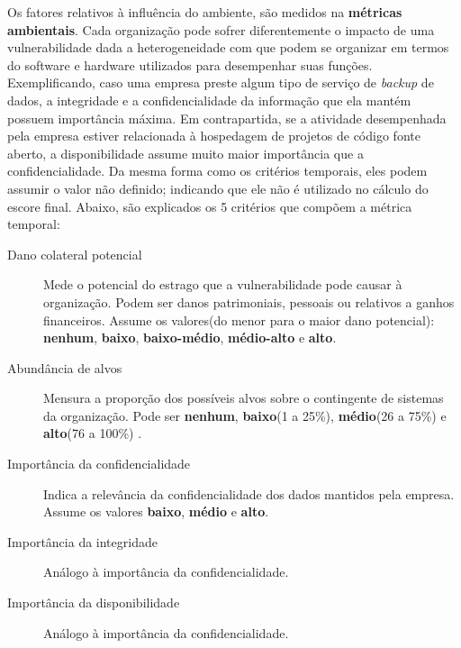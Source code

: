 			Os fatores relativos à influência do ambiente, são medidos na \textbf{métricas
			ambientais}. Cada organização pode sofrer diferentemente o impacto de uma
			vulnerabilidade dada a heterogeneidade com que podem se organizar em termos
			do software e hardware utilizados para desempenhar suas funções.
			Exemplificando, caso uma empresa preste algum tipo de serviço de \textsl{backup} de
			dados, a integridade e a confidencialidade da informação que ela mantém
			possuem importância máxima. Em contrapartida, se a atividade desempenhada pela
			empresa estiver relacionada à hospedagem de projetos de código fonte aberto,
			a disponibilidade assume muito maior importância que a confidencialidade.
			Da mesma forma como os critérios temporais, eles podem assumir o valor não definido;
			indicando que ele não é utilizado no cálculo do escore final.
			Abaixo, são explicados os 5 critérios que compõem a métrica temporal:
			\begin{description}
				\item[Dano colateral potencial]{
					Mede o potencial do estrago que a vulnerabilidade pode causar à organização.
					Podem ser danos patrimoniais, pessoais ou relativos a ganhos financeiros.
					Assume os valores(do menor para o maior dano potencial):
					\textbf{nenhum}, \textbf{baixo}, \textbf{baixo-médio}, \textbf{médio-alto} e
					\textbf{alto}}.
				\item[Abundância de alvos]{Mensura a proporção dos possíveis alvos
					sobre o contingente de sistemas da organização.
					Pode ser \textbf{nenhum}, \textbf{baixo}(1 a 25\%), 
					\textbf{médio}(26 a 75\%) e \textbf{alto}(76 a 100\%)
					.}
				\item[Importância da confidencialidade]{Indica a relevância da
					confidencialidade dos dados mantidos pela empresa. Assume os valores
					\textbf{baixo}, \textbf{médio} e \textbf{alto}.}
				\item[Importância da integridade]{Análogo à importância da confidencialidade.}
				\item[Importância da disponibilidade]{Análogo à importância da confidencialidade.}
			\end{description}
		


